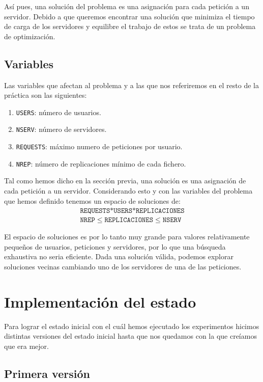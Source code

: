 Así pues, una solución del problema es una asignación para cada petición a un servidor. Debido a que queremos encontrar
una solución que minimiza el tiempo de carga de los servidores y equilibre el trabajo de estos se trata de un problema
de optimización.

\pagebreak
\subsection{Variables}%
\label{ssec:variables}

Las variables que afectan al problema y a las que nos referiremos en el resto de la práctica son las siguientes:

\begin{enumerate}
    \item \texttt{USERS}: número de usuarios.
    \item \texttt{NSERV}: número de servidores.
    \item \texttt{REQUESTS}: máximo numero de peticiones por usuario.
    \item \texttt{NREP}: número de replicaciones mínimo de cada fichero.
\end{enumerate}

Tal como hemos dicho en la sección previa, una solución es una asignación de cada petición a un servidor. Considerando
esto y con las variables del problema que hemos definido tenemos un espacio de soluciones de:
\begin{align}
\texttt{REQUESTS*USERS*REPLICACIONES} \\
\texttt{NREP} \leq \texttt{REPLICACIONES} \leq \texttt{NSERV}
\end{align}

El espacio de soluciones es por lo tanto muy grande para valores relativamente pequeños de usuarios, peticiones y
servidores, por lo que una búsqueda exhaustiva no seria eficiente. Dada una solución válida,
podemos explorar soluciones vecinas cambiando uno de los servidores de una de las peticiones. 

\section{Implementación del estado}

Para lograr el estado inicial con el cuál hemos ejecutado los experimentos hicimos distintas versiones del estado inicial hasta que nos quedamos con la que creíamos que era mejor.

\subsection{Primera versión}

